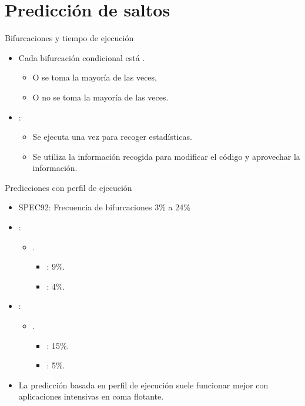 \section{Predicción de saltos}

\begin{frame}[t]{Bifurcaciones y tiempo de ejecución}
\begin{itemize}
  \item Cada bifurcación condicional está .
    \begin{itemize}
      \item O se toma la mayoría de las veces,
      \item O no se toma la mayoría de las veces.
    \end{itemize}

  \item {}:
    \begin{itemize}
      \item Se ejecuta una vez para recoger estadísticas.
      \item Se utiliza la información recogida para modificar el código y aprovechar la información.
    \end{itemize}
\end{itemize}
\end{frame}

\begin{frame}[t]{Predicciones con perfil de ejecución}
\begin{itemize}
  \item SPEC92: Frecuencia de bifurcaciones 3\% a 24\%
 
  \item {}:
    \begin{itemize}
      \item {}. 
        \begin{itemize}
          \item {}: 9\%. 
          \item {}: 4\%.
        \end{itemize}
    \end{itemize}
 
  \item {}:
    \begin{itemize}
      \item {}. 
        \begin{itemize}
          \item {}: 15\%. 
          \item {}: 5\%.
        \end{itemize}
    \end{itemize}

  \item La predicción basada en perfil de ejecución suele funcionar mejor
        con aplicaciones intensivas en coma flotante.
\end{itemize}
\end{frame}

